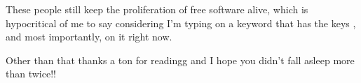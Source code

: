 \documentclass[sigplan,screen]{acmart}
\begin{document}
These people still keep the proliferation of free software alive, which is hypocritical of me to say considering I'm typing on a keyword that has the keys \cmdkey \ctlkey \optkey, and most importantly, \applekey on it right now.

Other than that thanks a ton for readingg and I hope you didn't fall asleep more than twice!!




\end{document}
